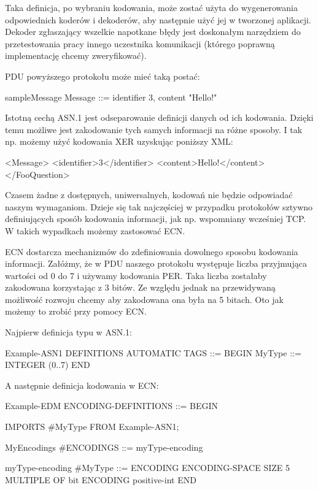 \documentclass[00-praca-magisterska.tex]{subfiles}
\begin{document}
Taka definicja, po wybraniu kodowania, może zostać użyta do wygenerowania
odpowiednich koderów i dekoderów, aby następnie użyć jej w tworzonej aplikacji.
Dekoder zgłaszający wszelkie napotkane błędy jest doskonałym narzędziem do
przetestowania pracy innego uczestnika komunikacji (którego poprawną
implementację chcemy zweryfikować).

PDU powyższego protokołu może mieć taką postać:

\begin{textcode}
  sampleMessage Message ::= {
      identifier     3,
      content        "Hello!"
  }
\end{textcode}

Istotną cechą ASN.1 jest odseparowanie definicji danych od ich kodowania.
Dzięki temu możliwe jest zakodowanie tych samych informacji na różne sposoby. I
tak np. możemy użyć kodowania XER uzyskując poniższy XML:

\begin{xmlcode}
  <Message>
      <identifier>3</identifier>
      <content>Hello!</content>
  </FooQuestion>
\end{xmlcode}

Czasem żadne z dostępnych, uniwersalnych, kodowań nie będzie odpowiadać naszym
wymaganiom. Dzieje się tak najczęściej w przypadku protokołów sztywno
definiujących sposób kodowania informacji, jak np. wspomniany wcześniej TCP. W
takich wypadkach możemy zastosować ECN.

ECN dostarcza mechanizmów do zdefiniowania dowolnego sposobu kodowania
informacji. Załóżmy, że w PDU naszego protokołu występuje liczba przyjmująca
wartości od 0 do 7 i używamy kodowania PER. Taka liczba zostałaby zakodowana
korzystając z 3 bitów. Ze względu jednak na przewidywaną możliwość rozwoju
chcemy aby zakodowana ona była na 5 bitach. Oto jak możemy to zrobić przy
pomocy ECN.

Najpierw definicja typu w ASN.1:

\begin{textcode}
  Example-ASN1 DEFINITIONS AUTOMATIC TAGS ::=
  BEGIN
    MyType ::= INTEGER (0..7)
  END
\end{textcode}

A następnie definicja kodowania w ECN:

\begin{textcode}
  Example-EDM ENCODING-DEFINITIONS ::=
  BEGIN
  
  IMPORTS
    #MyType
  FROM Example-ASN1;
  
  MyEncodings #ENCODINGS ::= { myType-encoding }
  
  myType-encoding #MyType ::= {
    ENCODING {
      ENCODING-SPACE
      SIZE 5
      MULTIPLE OF bit
      ENCODING positive-int
    }
  }
  END
\end{textcode}
\end{document}
